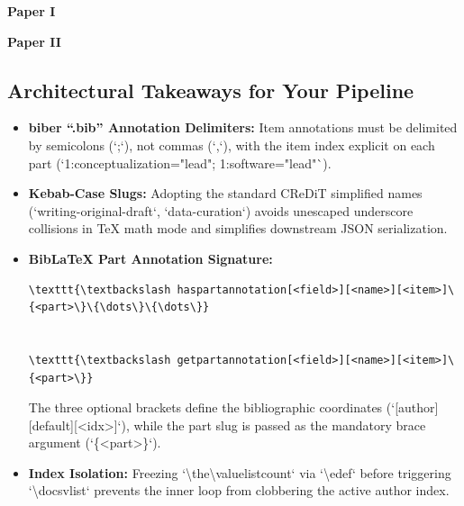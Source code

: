 \documentclass[12pt, twoside]{article}
\begin{document}
\DeclareNameFormat{creditnames}{%
  \edef\currentauthornum{\the\value{listcount}}%
  \par\smallskip\noindent\textbf{\namepartgiven} \textbf{\namepartfamily}%
  \def\do##1{\checkandprintrole{\currentauthornum}{##1}}%
  \expandafter\docsvlist\expandafter{\CreditSlugList}%
}



\textbf{Paper I}\\

\textbf{Paper II}\\
\endgroup



\subsection{Architectural Takeaways for Your Pipeline}
\begin{itemize}
    \item \textbf{biber \enquote{.bib} Annotation Delimiters:} Item annotations must be delimited by semicolons (`;`), not commas (`,`), with the item index explicit on each part (\eg `1:conceptualization="lead"; 1:software="lead"`).
    \item \textbf{Kebab-Case Slugs:} Adopting the standard \gls{CReDiT} simplified names (\eg `writing-original-draft`, `data-curation`) avoids unescaped underscore collisions in TeX math mode and simplifies downstream \gls{JSON} serialization.
    \item \textbf{BibLaTeX Part Annotation Signature:}
\begin{small}
\begin{verbatim}
\texttt{\textbackslash haspartannotation[<field>][<name>][<item>]\{<part>\}\{\dots\}\{\dots\}}


\texttt{\textbackslash getpartannotation[<field>][<name>][<item>]\{<part>\}}
\end{verbatim}
\end{small}

The three optional brackets define the bibliographic coordinates (`[author][default][<idx>]`), while the part slug is passed as the mandatory brace argument (`\{<part>\}`).
    \item \textbf{Index Isolation:} Freezing `\textbackslash the\textbackslash value{listcount}` via `\textbackslash edef` before triggering `\textbackslash docsvlist` prevents the inner loop from clobbering the active author index.
\end{itemize} 
\end{document}
